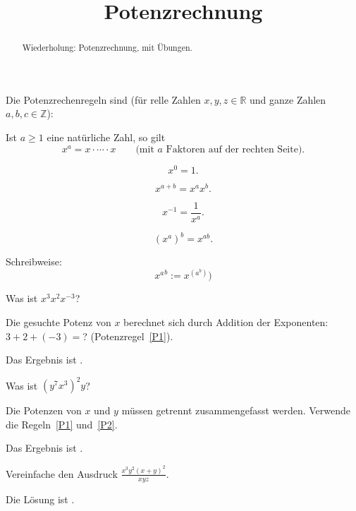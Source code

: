 \documentclass{ximera}
\title{Potenzrechnung}
\begin{document}
\begin{abstract}
Wiederholung: Potenzrechnung, mit Übungen.
\end{abstract}
\maketitle

Die Potenzrechenregeln sind (für relle Zahlen $x, y, z\in \mathbb R$ und ganze Zahlen $a,b,c\in\mathbb Z$):

Ist $a\ge 1$ eine natürliche Zahl, so gilt
\[
x^a = x \cdot \cdots \cdot x\qquad \text{(mit $a$ Faktoren auf der rechten Seite)}.
\]

\[
x^0 = 1.
\]

\begin{equation}\label{P1}
x^{a+b} = x^a x^b.
\end{equation}

\[
x^{-1} = \frac{1}{x^a}.
\]

\begin{equation}\label{P2}
(x^a)^b = x^{ab}.
\end{equation}

Schreibweise:
\[
{x^a}^b := x^{(a^b)})
\]



\begin{question}
Was ist $x^3x^2x^{-3}$?
\begin{solution}
\begin{hint}
Die gesuchte Potenz von $x$ berechnet sich durch Addition der Exponenten: $3+2+(-3)=$? (Potenzregel~\eqref{P1}).
\end{hint}
Das Ergebnis ist .
\end{solution}
\end{question}


\begin{question}
Was ist $(y^7x^3)^2y$?
\begin{hint}
Die Potenzen von $x$ und $y$ müssen getrennt zusammengefasst werden. Verwende die Regeln~\eqref{P1} und~\eqref{P2}.
\end{hint}
\begin{solution}
Das Ergebnis ist .
\end{solution}
\end{question}

\begin{question}
Vereinfache den Ausdruck $\frac{x^3y^2(x+y)^2}{xyz}$.
\begin{solution}
Die Lösung ist
.
\end{solution}
\end{question}
\end{document}
